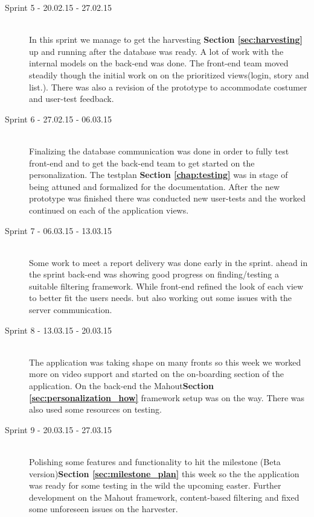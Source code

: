 \begin{description}
	\item[Sprint 5 - 20.02.15 - 27.02.15] \hfill \\ 
	In this sprint we manage to get the harvesting \textbf {Section \ref{sec:harvesting}} up and running after the database was ready. A lot of work with the internal models on the back-end was done. The front-end team moved steadily though the initial work on on the prioritized views(login, story and list.). There was also a revision of the prototype to accommodate costumer and user-test feedback.
		
	\item[Sprint 6 - 27.02.15 - 06.03.15] \hfill \\ 
	Finalizing the database communication was done in order to fully test front-end and to get the back-end team to get started on the personalization. The testplan \textbf {Section \ref*{chap:testing}} was in stage of being attuned and formalized for the documentation. After the new prototype was finished there was conducted new user-tests and the worked continued on each of the application views.
	
	\item[Sprint 7 - 06.03.15 - 13.03.15] \hfill \\ 
	Some work to meet a report delivery was done early in the sprint. ahead in the sprint back-end was showing good progress on finding/testing a suitable filtering framework. While front-end refined the look of each view to better fit the users needs. but also working out some issues with the server communication.
	
	\item[Sprint 8 - 13.03.15 - 20.03.15] \hfill \\ 
	The application was taking shape on many fronts so this week we worked more on video support and started on the on-boarding section of the application. On the back-end the Mahout\textbf {Section \ref{sec:personalization_how}} framework setup was on the way. There was also used some resources on testing.

	\item[Sprint 9 - 20.03.15 - 27.03.15] \hfill \\ 
	Polishing some features and functionality to hit the milestone (Beta version)\textbf {Section \ref{sec:milestone_plan}} this week so the the application was ready for some testing in the wild the upcoming easter. Further development on the Mahout framework, content-based filtering and fixed some unforeseen issues on the harvester.
	

\end{description}
